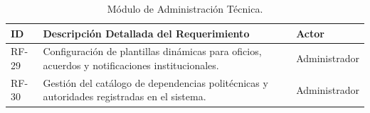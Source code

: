 \begin{table}[h!]
\centering
\scriptsize
\caption{Módulo de Administración Técnica.}
\label{tab:rf_admin}
\begin{tabular}{@{} l p{9.5cm} l @{}}
\toprule
\rowcolor[HTML]{2D3E50} 
\textbf{\color[HTML]{FFFFFF} ID} & \textbf{\color[HTML]{FFFFFF} Descripción Detallada del Requerimiento} & \textbf{\color[HTML]{FFFFFF} Actor} \\ \midrule
RF-29 & Configuración de plantillas dinámicas para oficios, acuerdos y notificaciones institucionales. & Administrador \\
\rowcolor[HTML]{F2F4F7} 
RF-30 & Gestión del catálogo de dependencias politécnicas y autoridades registradas en el sistema. & Administrador \\ \bottomrule
\end{tabular}
\end{table}